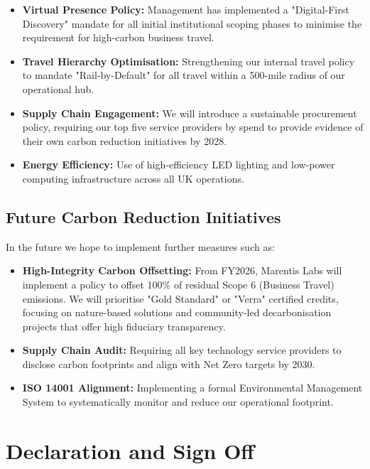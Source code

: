 \documentclass[11pt, a4paper]{article}
\begin{document}
\begin{itemize}
    \item \textbf{Virtual Presence Policy:} Management has implemented a "Digital-First Discovery" mandate for all initial institutional scoping phases to minimise the requirement for high-carbon business travel.
    \item \textbf{Travel Hierarchy Optimisation:} Strengthening our internal travel policy to mandate "Rail-by-Default" for all travel within a 500-mile radius of our operational hub.
    \item \textbf{Supply Chain Engagement:} We will introduce a sustainable procurement policy, requiring our top five service providers by spend to provide evidence of their own carbon reduction initiatives by 2028.
    \item \textbf{Energy Efficiency:} Use of high-efficiency LED lighting and low-power computing infrastructure across all UK operations.
\end{itemize}

\subsection{Future Carbon Reduction Initiatives}

In the future we hope to implement further measures such as:

\begin{itemize}
    \item \textbf{High-Integrity Carbon Offsetting:} From FY2026, Marentis Labs will implement a policy to offset 100\% of residual Scope 6 (Business Travel) emissions. We will prioritise "Gold Standard" or "Verra" certified credits, focusing on nature-based solutions and community-led decarbonisation projects that offer high fiduciary transparency.
    \item \textbf{Supply Chain Audit:} Requiring all key technology service providers to disclose carbon footprints and align with Net Zero targets by 2030.
    \item \textbf{ISO 14001 Alignment:} Implementing a formal Environmental Management System to systematically monitor and reduce our operational footprint.
\end{itemize}

\section{Declaration and Sign Off}
\label{sec:declaration}
\end{document}
